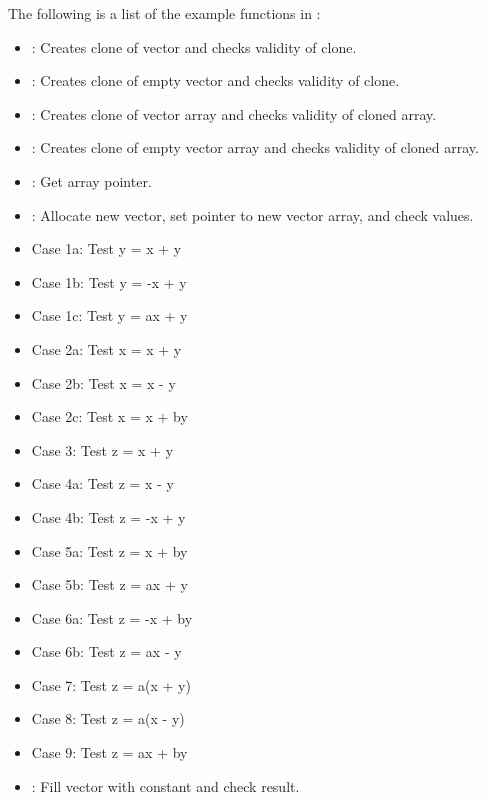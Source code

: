 \noindent The following is a list of the example functions in :
\begin{itemize}
\item {}: Creates clone of vector and checks validity of clone.  
\item {}: Creates clone of empty vector and checks validity of clone.  
\item {}: Creates clone of vector array and checks validity of cloned array.  
\item {}: Creates clone of empty vector array and checks validity of cloned array.  
\item {}: Get array pointer. 
\item {}: Allocate new vector, set pointer to new vector array, and check values. 
\item {} Case 1a: Test y =  x + y 
\item {} Case 1b: Test y = -x + y 
\item {} Case 1c: Test y = ax + y
\item {} Case 2a: Test x =  x + y
\item {} Case 2b: Test x =  x - y
\item {} Case 2c: Test x =  x + by
\item {} Case 3:  Test z =  x + y
\item {} Case 4a: Test z =  x - y
\item {} Case 4b: Test z = -x + y
\item {} Case 5a: Test z =  x + by
\item {} Case 5b: Test z = ax + y
\item {} Case 6a: Test z = -x + by
\item {} Case 6b: Test z = ax - y
\item {} Case 7:  Test z = a(x + y)
\item {} Case 8:  Test z = a(x - y)
\item {} Case 9:  Test z = ax + by
\item {}: Fill vector with constant and check result.

\end{itemize}
